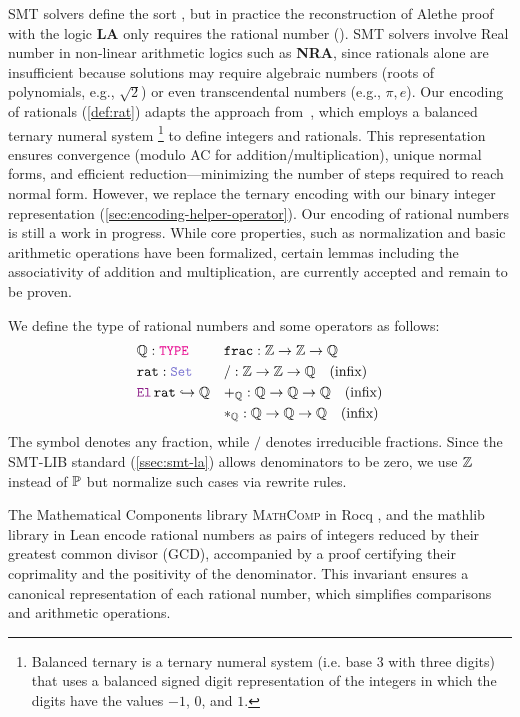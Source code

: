 SMT solvers define the sort , but in practice the reconstruction of Alethe proof with the logic \uppercase{\textbf{LA}} only requires the rational number (\Q).
SMT solvers involve Real number in non-linear arithmetic logics such as \uppercase{\textbf{NRA}}, since rationals alone are insufficient because solutions may require algebraic numbers (roots of polynomials, e.g., $\sqrt{2}$) or even transcendental numbers (e.g., $\pi, e$).
Our encoding of rationals (\cref{def:rat}) adapts the approach from~\cite{frac-rw}, which employs a balanced ternary numeral system
\footnote{Balanced ternary is a ternary numeral system (i.e. base $3$ with three digits) that uses a balanced signed digit representation of the integers in which the digits have the values $-1$, $0$, and $1$.}
to define integers and rationals.
This representation ensures convergence (modulo AC for addition/multiplication), unique normal forms, and efficient reduction—minimizing the number of steps required to reach normal form.
However, we replace the ternary encoding with our binary integer representation (\cref{sec:encoding-helper-operator}).
Our encoding of rational numbers is still a work in progress.
While core properties, such as normalization and basic arithmetic operations have been formalized, certain lemmas including the associativity of addition and multiplication, are currently accepted and remain to be proven.

\begin{definition}[Rational]\label{def:rat}
We define the type of rational numbers and some operators as follows:
\begin{align*}
& \Q \index{$\Q$}: \type            & &\kw{frac} \index{$\kw{frac}$}: \Z \ra \Z \ra \Q \\
& \kw{rat} \index{$\kw{rat}$}: \set       & &\slash \index{$\slash$}: \Z \ra \Z \ra \Q \quad \text{(infix)} \\
& \el\,\kw{rat} \re \Q & &+_\Q : \Q \ra \Q \ra \Q \quad \text{(infix)}\\
&                      & &*_\Q : \Q \ra \Q \ra \Q \quad \text{(infix)}\\
\end{align*}
The symbol  denotes any fraction, while $\slash$ denotes irreducible fractions.
Since the SMT-LIB standard (\cref{ssec:smt-la}) allows denominators to be zero, we use $\mathbb{Z}$ instead of $\mathbb{P}$ but normalize such cases via rewrite rules.
\end{definition}

The Mathematical Components library \textsc{MathComp} \cite{mathcomp}  in Rocq \cite{Rocq-refman}, and the mathlib library \cite{mathlib} in Lean \cite{lean4:2021} encode rational numbers as pairs of integers reduced by their greatest common divisor (GCD), accompanied by a proof certifying their coprimality and the positivity of the denominator.
This invariant ensures a canonical representation of each rational number, which simplifies comparisons and arithmetic operations.

